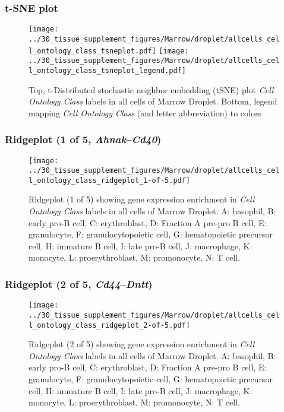 \clearpage
\subsubsection{t-SNE plot}
\begin{figure}[h]
\centering
\texttt{[image: ../30\_tissue\_supplement\_figures/Marrow/droplet/allcells\_cell\_ontology\_class\_tsneplot.pdf]}
\texttt{[image: ../30\_tissue\_supplement\_figures/Marrow/droplet/allcells\_cell\_ontology\_class\_tsneplot\_legend.pdf]}
\caption{Top, t-Distributed stochastic neighbor embedding (tSNE) plot  \emph{Cell Ontology Class} labels in all cells of Marrow Droplet. Bottom, legend mapping \emph{Cell Ontology Class} (and letter abbreviation) to colors}
\end{figure}


\clearpage

\subsubsection{Ridgeplot (1 of 5, \emph{Ahnak}--\emph{Cd40})}
\begin{figure}[h]
\centering
\texttt{[image: ../30\_tissue\_supplement\_figures/Marrow/droplet/allcells\_cell\_ontology\_class\_ridgeplot\_1-of-5.pdf]}

\caption{ Ridgeplot (1 of 5)  showing gene expression enrichment in \emph{Cell Ontology Class} labels in all cells of Marrow Droplet. A: basophil, B: early pro-B cell, C: erythroblast, D: Fraction A pre-pro B cell, E: granulocyte, F: granulocytopoietic cell, G: hematopoietic precursor cell, H: immature B cell, I: late pro-B cell, J: macrophage, K: monocyte, L: proerythroblast, M: promonocyte, N: T cell.}
\end{figure}


\clearpage

\subsubsection{Ridgeplot (2 of 5, \emph{Cd44}--\emph{Dntt})}
\begin{figure}[h]
\centering
\texttt{[image: ../30\_tissue\_supplement\_figures/Marrow/droplet/allcells\_cell\_ontology\_class\_ridgeplot\_2-of-5.pdf]}

\caption{ Ridgeplot (2 of 5)  showing gene expression enrichment in \emph{Cell Ontology Class} labels in all cells of Marrow Droplet. A: basophil, B: early pro-B cell, C: erythroblast, D: Fraction A pre-pro B cell, E: granulocyte, F: granulocytopoietic cell, G: hematopoietic precursor cell, H: immature B cell, I: late pro-B cell, J: macrophage, K: monocyte, L: proerythroblast, M: promonocyte, N: T cell.}
\end{figure}


